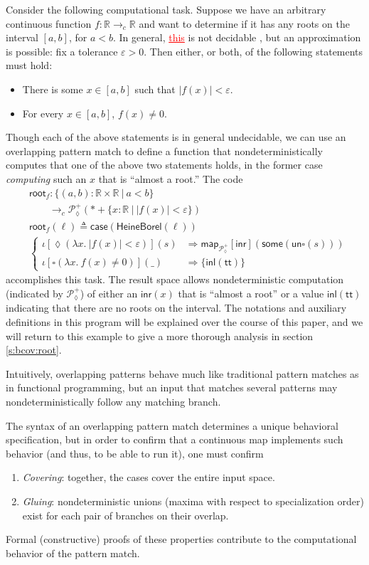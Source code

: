\documentclass[conference]{IEEEtran}
\newcommand{\PLower}{\mathcal{P}_\lozenge}
\newcommand{\cto}{\to_c}
\newcommand{\R}{\mathbb{R}}
\newcommand{\map}[2]{\mathsf{map}_{#1}[{#2}]}
\newcommand{\fun}[2]{\lambda {#1}.\  {#2}}
\newcommand{\suchthat}{\ |\ }
\newcommand{\One}{\ast}
\newcommand{\wildcard}{\_}
\newcommand{\oinclf}[1]{\iota[{#1}]}
\newcommand{\oincl}[2]{\oinclf{#1} \left({#2}\right)}
\newcommand{\Branch}{\Rightarrow}
\newcommand{\grammar}[1]{\textcolor{red}{\underline{#1}}}
\begin{document}
Consider the following computational task. Suppose we have an arbitrary continuous function $f : \R \cto \R$ and want to determine if it has any roots on the interval $[a,b]$, for $a < b$. In general, \grammar{this} is not decidable \cite{lamcra}, but an approximation is possible: fix a tolerance $\varepsilon > 0$. Then either, or both, of the following statements must hold:
\begin{itemize}
\item There is some $x \in [a, b]$ such that $|f(x)| < \varepsilon$.
\item For every $x \in [a, b]$, $f(x) \neq 0$.
\end{itemize}
Though each of the above statements is in general undecidable, we can use an overlapping pattern match to define a function that nondeterministically computes that one of the above two statements holds, in the former case \emph{computing} such an $x$ that is ``almost a root.'' The code
\begin{align*}
&\mathsf{root}_f : \{ (a, b) : \R \times \R \suchthat a < b \}
  \\ &\qquad \cto \PLower^+(\One + \{ x : \R \suchthat |f(x)| < \varepsilon \})
\\ &\mathsf{root}_f(\ell) \triangleq \mathsf{case}(\mathsf{HeineBorel}(\ell))
\\ &\begin{cases}
\oincl{\lozenge (\fun{x}{|f(x)| < \varepsilon})}{s} 
  &\Branch \map{\PLower^+}{\mathsf{inr}}(\mathsf{some}(\mathsf{un}\square(s)))
\\ \oincl{\square (\fun{x}{f(x) \neq 0})}{\wildcard}
  &\Branch \{ \mathsf{inl}(\mathsf{tt}) \}
\end{cases}
\end{align*}
accomplishes this task.
The result space allows nondeterministic computation (indicated by $\PLower^+$) of either an $\mathsf{inr}(x)$ that is ``almost a root'' or a value $\mathsf{inl}(\mathsf{tt})$ indicating that there are no roots on the interval.
The notations and auxiliary definitions in this program will be explained over the course of this paper, and we will return to this example to give a more thorough analysis in section \ref{s:bcov:root}.
 
Intuitively, overlapping patterns behave much like traditional pattern matches as in functional programming, but an input that matches several patterns may nondeterministically follow any matching branch.

The syntax of an overlapping pattern match determines a unique behavioral specification, but in order to confirm that a continuous map implements such behavior (and thus, to be able to run it), one must confirm
\begin{enumerate}
\item \emph{Covering}: together, the cases cover the entire input space.
\item \emph{Gluing}: nondeterministic unions (maxima with respect to specialization order) exist for each pair of branches on their overlap.
\end{enumerate}
Formal (constructive) proofs of these properties contribute to the computational behavior of the pattern match.
\end{document}
